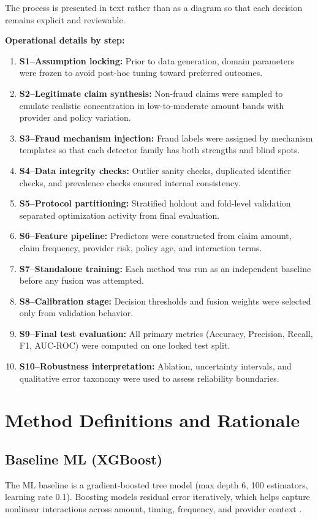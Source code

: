 \documentclass[12pt,a4paper]{report}
\begin{document}
The process is presented in text rather than as a diagram so that each decision remains explicit and reviewable.

\noindent\textbf{Operational details by step:}
\begin{enumerate}
\item \textbf{S1--Assumption locking:} Prior to data generation, domain parameters were frozen to avoid post-hoc tuning toward preferred outcomes.
\item \textbf{S2--Legitimate claim synthesis:} Non-fraud claims were sampled to emulate realistic concentration in low-to-moderate amount bands with provider and policy variation.
\item \textbf{S3--Fraud mechanism injection:} Fraud labels were assigned by mechanism templates so that each detector family has both strengths and blind spots.
\item \textbf{S4--Data integrity checks:} Outlier sanity checks, duplicated identifier checks, and prevalence checks ensured internal consistency.
\item \textbf{S5--Protocol partitioning:} Stratified holdout and fold-level validation separated optimization activity from final evaluation.
\item \textbf{S6--Feature pipeline:} Predictors were constructed from claim amount, claim frequency, provider risk, policy age, and interaction terms.
\item \textbf{S7--Standalone training:} Each method was run as an independent baseline before any fusion was attempted.
\item \textbf{S8--Calibration stage:} Decision thresholds and fusion weights were selected only from validation behavior.
\item \textbf{S9--Final test evaluation:} All primary metrics (Accuracy, Precision, Recall, F1, AUC-ROC) were computed on one locked test split.
\item \textbf{S10--Robustness interpretation:} Ablation, uncertainty intervals, and qualitative error taxonomy were used to assess reliability boundaries.
\end{enumerate}

\section{Method Definitions and Rationale}

\subsection{Baseline ML (XGBoost)}
The ML baseline is a gradient-boosted tree model (max depth 6, 100 estimators, learning rate 0.1). Boosting models residual error iteratively, which helps capture nonlinear interactions across amount, timing, frequency, and provider context \citep{chen2016}.
\end{document}
